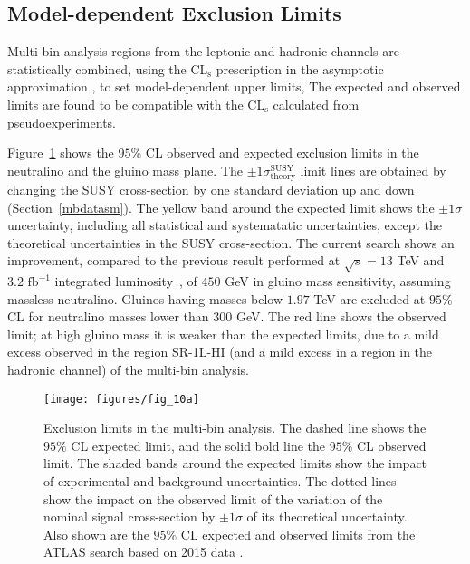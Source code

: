 \subsection{Model-dependent Exclusion Limits}\label{mb:mdel}

Multi-bin analysis regions from the leptonic and hadronic channels are
statistically combined, using the CL$_{\text{s}}$ prescription in the
asymptotic approximation \cite{Cowan:2010js}, to set model-dependent upper
limits, The expected and observed limits are found to be compatible with the
CL$_{\text{s}}$ calculated from pseudoexperiments.

Figure~\ref{f:fig_10a} shows the $95\%$ CL observed and expected exclusion
limits in the neutralino and the gluino mass plane. The $\pm 1
	\sigma^{\text{SUSY}}_{\text{theory}}$ limit lines are obtained by changing the
SUSY cross-section by one standard deviation up and down
(Section~\ref{mbdatasm}). The yellow band around the expected limit shows the
$\pm 1\sigma$ uncertainty, including all statistical and systematatic
uncertainties, except the theoretical uncertainties in the SUSY cross-section.
The current search shows an improvement, compared to the previous result
performed at $\sqrt{s}=13$ TeV and $3.2 \text{ fb}^{-1}$ integrated
luminosity~\cite{Aad:2016eki}, of $450$ GeV in gluino mass sensitivity,
assuming massless neutralino. Gluinos having masses below $1.97$ TeV are
excluded at $95\%$ CL for neutralino masses lower than $300$ GeV. The red line
shows the observed limit; at high gluino mass it is weaker than the expected
limits, due to a mild excess observed in the region SR-1L-HI (and a mild excess
in a region in the hadronic channel) of the multi-bin analysis.


\begin{figure}[H]
	\texttt{[image: figures/fig\_10a]}
	\centering

	\caption{Exclusion limits in the multi-bin analysis. The dashed line shows the
		$95\%$ CL expected limit, and the solid bold line the $95\%$ CL observed limit.
		The shaded bands around the expected limits show the impact of experimental and
		background uncertainties. The dotted lines show the impact on the observed
		limit of the variation of the nominal signal cross-section by $\pm 1 \sigma$ of
		its theoretical uncertainty. Also shown are the $95\%$ CL expected and observed
		limits from the ATLAS search based on 2015 data \cite{Aad:2016eki}.}

	\label{f:fig_10a}
\end{figure}



